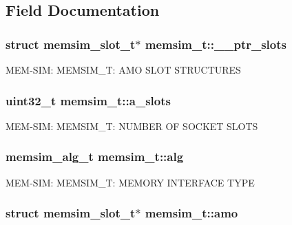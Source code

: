 \subsection{Field Documentation}
\hypertarget{structmemsim__t_a13bfc8f8ea24eb83b5b3976aee534db3}{
\subsubsection[{\-\_\-\-\_\-ptr\-\_\-slots}]{\setlength{\rightskip}{0pt plus 5cm}struct {\bf memsim\-\_\-slot\-\_\-t}$\ast$ memsim\-\_\-t\-::\-\_\-\-\_\-ptr\-\_\-slots}}\label{structmemsim__t_a13bfc8f8ea24eb83b5b3976aee534db3}
M\-E\-M-\/\-S\-I\-M\-: M\-E\-M\-S\-I\-M\-\_\-\-T\-: A\-M\-O S\-L\-O\-T S\-T\-R\-U\-C\-T\-U\-R\-E\-S \hypertarget{structmemsim__t_a855dbf0b36cad4e37ccb8dcb26caa864}{
\subsubsection[{a\-\_\-slots}]{\setlength{\rightskip}{0pt plus 5cm}uint32\-\_\-t memsim\-\_\-t\-::a\-\_\-slots}}\label{structmemsim__t_a855dbf0b36cad4e37ccb8dcb26caa864}
M\-E\-M-\/\-S\-I\-M\-: M\-E\-M\-S\-I\-M\-\_\-\-T\-: N\-U\-M\-B\-E\-R O\-F S\-O\-C\-K\-E\-T S\-L\-O\-T\-S \hypertarget{structmemsim__t_ae9ec2da913a82a570dae07d3ae8d09b3}{
\subsubsection[{alg}]{\setlength{\rightskip}{0pt plus 5cm}memsim\-\_\-alg\-\_\-t memsim\-\_\-t\-::alg}}\label{structmemsim__t_ae9ec2da913a82a570dae07d3ae8d09b3}
M\-E\-M-\/\-S\-I\-M\-: M\-E\-M\-S\-I\-M\-\_\-\-T\-: M\-E\-M\-O\-R\-Y I\-N\-T\-E\-R\-F\-A\-C\-E T\-Y\-P\-E \hypertarget{structmemsim__t_a9e7a2ce164d954f25105d93eaf040b3f}{
\subsubsection[{amo}]{\setlength{\rightskip}{0pt plus 5cm}struct {\bf memsim\-\_\-slot\-\_\-t}$\ast$ memsim\-\_\-t\-::amo}}\label{structmemsim__t_a9e7a2ce164d954f25105d93eaf040b3f}
